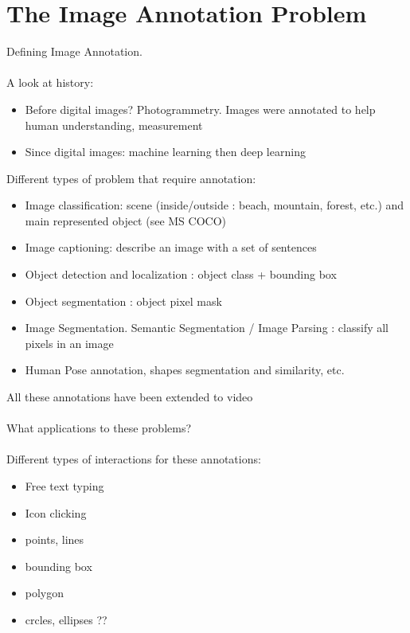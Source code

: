 \chapter{The Image Annotation Problem}%
\label{cha:the_image_annotation_problem}

\minitoc%

Defining Image Annotation. \\ \\ 



A look at history:
\begin{itemize}
	\item Before digital images? Photogrammetry. Images were annotated to help human understanding, measurement
	\item Since digital images: machine learning then deep learning
\end{itemize}


Different types of problem that require annotation:
\begin{itemize}
	\item Image classification: scene (inside/outside : beach, mountain, forest, etc.) and main represented object (see MS COCO)
	\item Image captioning: describe an image with a set of sentences
	\item Object detection and localization : object class + bounding box
	\item Object segmentation : object pixel mask
	\item Image Segmentation. Semantic Segmentation / Image Parsing : classify all pixels in an image
	\item Human Pose annotation, shapes segmentation and similarity, etc.
\end{itemize}
All these annotations have been extended to video \\ \\

What applications to these problems? \\ \\

Different types of interactions for these annotations:

\begin{itemize}
	\item Free text typing
	\item Icon clicking
	\item points, lines
	\item bounding box
	\item polygon
	\item crcles, ellipses ??
\end{itemize}

